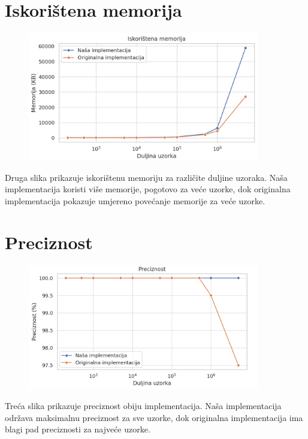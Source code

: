 \documentclass[seminarskirad]{fer}
\begin{document}
\section{Iskorištena memorija}
\begin{figure}[h]
	\centering
	\includegraphics[width=0.9\textwidth]{images/nasumicni_rezultati_memorija.png}
	\label{fig:nasumicni_rezultati_memorija}
\end{figure}
Druga slika prikazuje iskorištenu memoriju za različite duljine uzoraka. Naša implementacija koristi više memorije, pogotovo za veće uzorke, dok originalna implementacija pokazuje umjereno povećanje memorije za veće uzorke.

\section{Preciznost}
\begin{figure}[h]
	\centering
	\includegraphics[width=0.9\textwidth]{images/nasumicni_rezultati_preciznost.png}
	\label{fig:nasumicni_rezultati_preciznost}
\end{figure}
Treća slika prikazuje preciznost obiju implementacija. Naša implementacija održava maksimalnu preciznost za sve uzorke, dok originalna implementacija ima blagi pad preciznosti za najveće uzorke.
\end{document}
